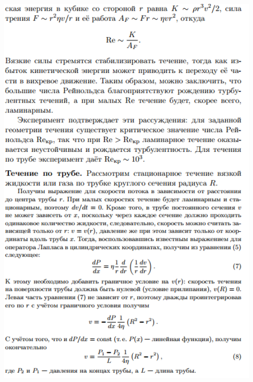 \documentclass[12pt]{article}
\begin{document}
\begin{center}
    	\includegraphics[width=16cm]{theory_4.png}

\end{center}
\end{document}
